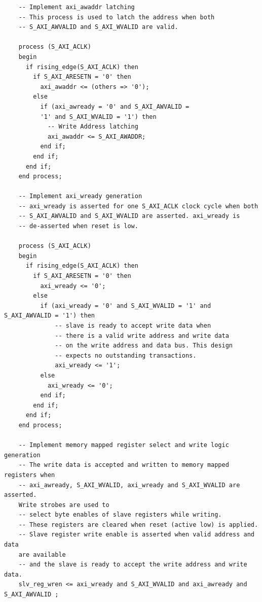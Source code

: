 \documentclass[a4paper,openright,12pt]{report}
\begin{document}
\begin{lstlisting}
	-- Implement axi_awaddr latching
	-- This process is used to latch the address when both 
	-- S_AXI_AWVALID and S_AXI_WVALID are valid. 

	process (S_AXI_ACLK)
	begin
	  if rising_edge(S_AXI_ACLK) then 
	    if S_AXI_ARESETN = '0' then
	      axi_awaddr <= (others => '0');
	    else
	      if (axi_awready = '0' and S_AXI_AWVALID =
          '1' and S_AXI_WVALID = '1') then
	        -- Write Address latching
	        axi_awaddr <= S_AXI_AWADDR;
	      end if;
	    end if;
	  end if;                   
	end process; 

	-- Implement axi_wready generation
	-- axi_wready is asserted for one S_AXI_ACLK clock cycle when both
	-- S_AXI_AWVALID and S_AXI_WVALID are asserted. axi_wready is 
	-- de-asserted when reset is low. 

	process (S_AXI_ACLK)
	begin
	  if rising_edge(S_AXI_ACLK) then 
	    if S_AXI_ARESETN = '0' then
	      axi_wready <= '0';
	    else
	      if (axi_wready = '0' and S_AXI_WVALID = '1' and S_AXI_AWVALID = '1') then
	          -- slave is ready to accept write data when 
	          -- there is a valid write address and write data
	          -- on the write address and data bus. This design 
	          -- expects no outstanding transactions.           
	          axi_wready <= '1';
	      else
	        axi_wready <= '0';
	      end if;
	    end if;
	  end if;
	end process; 

	-- Implement memory mapped register select and write logic generation
	-- The write data is accepted and written to memory mapped registers when
	-- axi_awready, S_AXI_WVALID, axi_wready and S_AXI_WVALID are asserted.
    Write strobes are used to
	-- select byte enables of slave registers while writing.
	-- These registers are cleared when reset (active low) is applied.
	-- Slave register write enable is asserted when valid address and data 
    are available
	-- and the slave is ready to accept the write address and write data.
	slv_reg_wren <= axi_wready and S_AXI_WVALID and axi_awready and S_AXI_AWVALID ;


\end{lstlisting}
\end{document}
